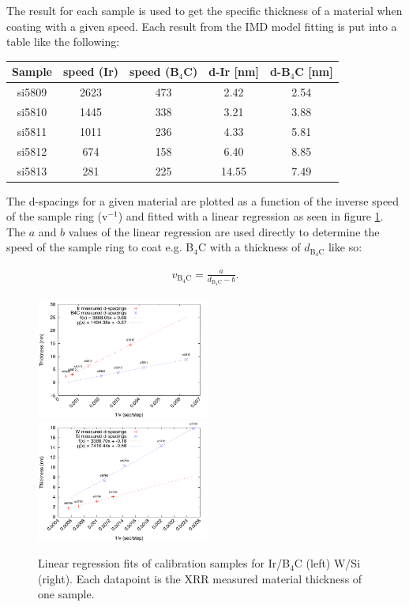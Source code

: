 The result for each sample is used to get the specific thickness of a material when coating with a given speed. Each result from the IMD model fitting is put into a table like the following:

\begin{center}
\begin{tabular}{c|c|c|c|c}
Sample & speed (Ir) & speed (B$_4$C) & d-Ir [nm] & d-B$_4$C [nm] \\
\hline
si5809 & 2623 & 473 & 2.42 & 2.54 \\
si5810 & 1445 & 338 & 3.21 & 3.88 \\
si5811 & 1011 & 236 & 4.33 & 5.81 \\
si5812 &  674 & 158 & 6.40 & 8.85 \\
si5813 & 281 & 225 & 14.55 & 7.49
\end{tabular}
\end{center}

The d-spacings for a given material are plotted as a function of the inverse speed of the sample ring (v$^{-1}$) and fitted with a linear regression as seen in figure \ref{fig:calib-fit}. The $a$ and $b$ values of the linear regression are used directly to determine the speed of the sample ring to coat e.g. B$_4$C with a thickness of $d_{\mathrm{B}_4\mathrm{C}}$ like so:

\begin{eqnarray}
	v_{\mathrm{B}_4\mathrm{C}} = \frac{a}{d_{\mathrm{B}_4\mathrm{C}}-b}.
\end{eqnarray}

\begin{figure}[!h]
	\center
	\includegraphics[height=4cm]{figures/chamber/calibration_plot-ir-b4c.pdf}
	\includegraphics[height=4cm]{figures/chamber/calibration_plot-w-si.pdf}
\caption{\footnotesize Linear regression fits of calibration samples for Ir/B$_4$C (left) W/Si (right). Each datapoint is the XRR measured material thickness of one sample.}\label{fig:calib-fit}
\end{figure}
